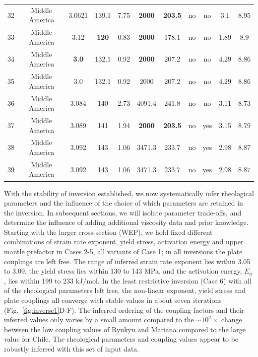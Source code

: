 \documentclass[12pt]{article}
\begin{document}
{\begin{table}
\begin{table}[H]
{\begin{tabular}{c c c c c c c c c c c }
            32 &Middle America  & 3.0621 & 139.1 & 7.75& \textbf{2000} & \textbf{203.5} &no  &no &3.1 & $8.95$ \\               
            33 &Middle America  & 3.12 & \textbf{120} & 0.83& \textbf{2000} & 178.1 &no &no &1.89 & $8.9$ \\       
            34 &Middle America  & \textbf{3.0} & 132.1 & 0.92& \textbf{2000}& 207.2 &no &no &4.29 & $8.86$   \\      
            35 &Middle America  & 3.0 & 132.1 & 0.92& 2000& 207.2 &no &no &4.29 & $8.86$ \\     
            36 &Middle America  & 3.084 & 140 & 2.73& 4091.4 & 241.8 &no  &no &3.11 & $8.73$ \\                  
            37 &Middle America  & 3.089 & 141 & 1.94& \textbf{2000} & \textbf{203.5} &no  &yes & 3.15 & $8.79$\\              
           38 &Middle America  & 3.092 & 143 & 1.06& 3471.3 & 233.7 &no  &yes &2.98 &$8.87$ \\       
           39 &Middle America  & 3.092 & 143 & 1.06& 3471.3 & 233.7 &no  &yes &2.98 &$8.87$ \\             
                \hline %
		\end{tabular}
        }
		\label{table:inversions} %
		\end{table}
\end{table}


With the stability of inversion established, we now systematically infer rheological parameters and the influence of the choice of which parameters are retained in the inversion. In subsequent sections, we will isolate parameter trade-offs, and determine the influence of adding additional viscosity data and prior knowledge. 
Starting with the larger cross-section (WEP), we hold fixed different combinations of strain rate exponent, yield stress, activation energy and upper mantle prefactor in Cases 2-5, all variants of Case 1; in all inversions the plate couplings are left free. The range of inferred strain rate exponent lies within  3.05 to 3.09, the yield stress lies within 130 to 143 MPa, and the activation energy, $E_a$, lies within 199 to 233 kJ/mol. In the least restrictive inversion (Case 6) with all of the rheological parameters left free, the non-linear exponent, yield stress and plate couplings all converge with stable values in about seven iterations (Fig.~\ref{fig:inverse1}D-F).
The inferred ordering of the coupling factors and their inferred values only varies by a small amount compared to the $\sim10^2\times$ change between the low coupling values of Ryukyu and Mariana compared to the large value for Chile.
The rheological parameters and coupling values appear to be robustly inferred with this set of input data.


}
\end{document}
